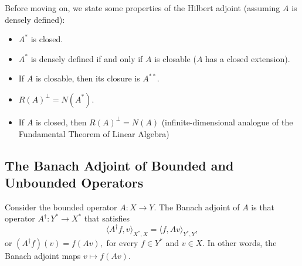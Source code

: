 \documentclass[12pt,a4paper]{article}
\theoremstyle{boldthm}
\theoremstyle{bolddefn}
\begin{document}
Before moving on, we state some properties of the Hilbert adjoint (assuming $A$ is densely defined):

\begin{itemize}
    \item  $A^*$ is closed. 
    \item $A^*$ is densely defined if and only if $A$ is closable ($A$ has a closed extension). 
    \item If $A$ is closable, then its closure is $A^{**}.$
    \item $R(A)^\perp = N(A^*).$
    \item If $A$ is closed, then $R(A)^\perp = N(A)$ (infinite-dimensional analogue of the Fundamental Theorem of Linear Algebra)
\end{itemize}

\subsection{The Banach Adjoint of Bounded and Unbounded Operators}

Consider the bounded operator $A : X \rightarrow Y.$ The Banach adjoint of $A$ is that operator $A^\dagger : Y^* \rightarrow X^*$ that satisfies 
\begin{equation}
    \langle A^\dagger f, v \rangle_{X^*, X} = \langle f, Av \rangle_{Y^*, Y},
\end{equation}
or $(A^\dagger f)(v) = f(Av),$
for every $f \in Y^*$ and $v \in X.$ In other words, the Banach adjoint maps $v \mapsto f(Av).$


\end{document}
